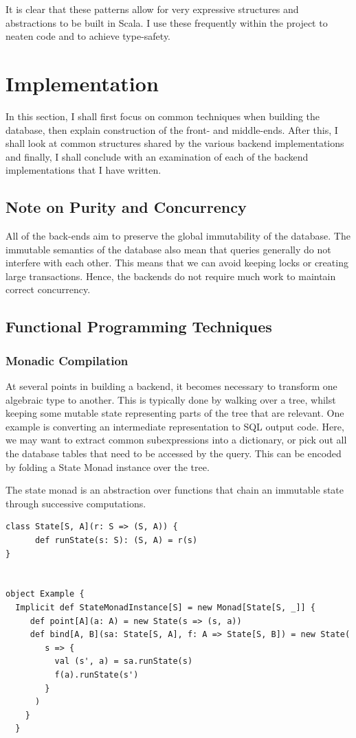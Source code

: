 \documentclass[12pt,a4paper,twoside,openright]{report}
\renewcommand{\baselinestretch}{1.1}    %
\begin{document}
It is clear that these patterns allow for very expressive structures and abstractions to be built in Scala. I use these frequently within the project to neaten code and to achieve type-safety.



\chapter{Implementation}

In this section, I shall first focus on common techniques when building the database, then explain construction of the front- and middle-ends. After this, I shall look at common structures shared by the various backend implementations and finally, I shall conclude with an examination of each of the backend implementations that I have written. 
\section{Note on Purity and Concurrency}
All of the back-ends aim to preserve the global immutability of the database. The immutable semantics of the database also mean that queries generally do not interfere with each other. This means that we can avoid keeping locks or creating large transactions. Hence, the backends do not require much work to maintain correct concurrency.
\section{Functional Programming Techniques}
	\subsection{Monadic Compilation}
	At several points in building a backend, it becomes necessary to transform one algebraic type to another. This is typically done by walking over a tree, whilst keeping some mutable state representing parts of the tree that are relevant. One example is converting an intermediate representation to SQL output code. Here, we may want to extract common subexpressions into a dictionary, or pick out all the database tables that need to be accessed by the query. This can be encoded by folding a State Monad instance over the tree.

The state monad is an abstraction over functions that chain an immutable state through successive computations.

\renewcommand{\baselinestretch}{0.8}
\begin{framed}
\begin{verbatim}
class State[S, A](r: S => (S, A)) {
      def runState(s: S): (S, A) = r(s)
}


object Example {
  Implicit def StateMonadInstance[S] = new Monad[State[S, _]] {
     def point[A](a: A) = new State(s => (s, a))
     def bind[A, B](sa: State[S, A], f: A => State[S, B]) = new State(
        s => {
          val (s', a) = sa.runState(s)
          f(a).runState(s')
        }           
      )
    }
  }
\end{verbatim}
\end{framed}
\renewcommand{\baselinestretch}{1.1}
\end{document}
